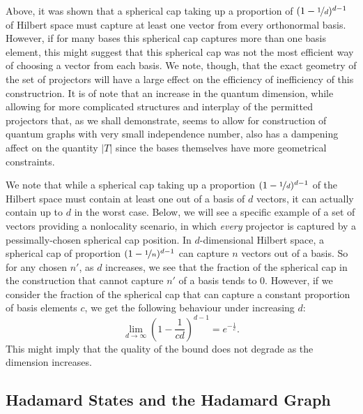 \documentclass{amsart}
\theoremstyle{definition}
\begin{document}
Above, it was shown that a spherical cap taking up a proportion of $(1-\nicefrac1d)^{d-1}$ of Hilbert space must capture at least one vector from every orthonormal basis. However, if for many bases this spherical cap captures more than one basis element, this might suggest that this spherical cap was not the most efficient way of choosing a vector from each basis. We note, though, that the exact geometry of the set of projectors will have a large effect on the efficiency of inefficiency of this constructrion. It is of note that an increase in the quantum dimension, while allowing for more complicated structures and interplay of the permitted projectors that, as we shall demonstrate, seems to allow for construction of quantum graphs with very small independence number, also has a dampening affect on the quantity $|T|$ since the bases themselves have more geometrical constraints.

We note that while a spherical cap taking up a proportion $(1-\nicefrac1d)^{d-1}$ of the Hilbert space must contain at least one out of a basis of $d$ vectors, it can actually contain up to $d$ in the worst case. Below, we will see a specific example of a set of vectors providing a nonlocality scenario, in which \emph{every} projector is captured by a pessimally-chosen spherical cap position. In $d$-dimensional Hilbert space, a spherical cap of proportion $(1-\nicefrac1n)^{d-1}$ can capture $n$ vectors out of a basis. So for any chosen $n'$, as $d$ increases, we see that the fraction of the spherical cap in the construction that cannot capture $n'$ of a basis tends to 0. However, if we consider the fraction of the spherical cap that can capture a constant proportion of basis elements $c$, we get the following behaviour under increasing $d$:
\begin{equation}
\lim_{d\rightarrow\infty} \left(1-\frac{1}{cd}\right)^{d-1}=e^{-\frac1c}.
\end{equation}
This might imply that the quality of the bound does not degrade as the dimension increases.%


\subsection{Hadamard States and the Hadamard Graph}
\end{document}
